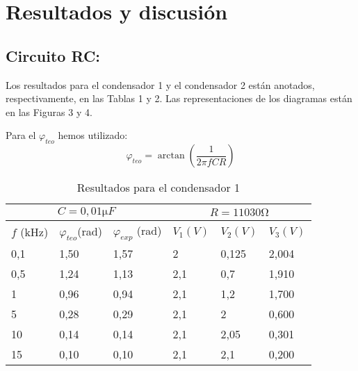 \documentclass[a4paper,12pt,spanish]{article}
\begin{document}
\section{Resultados y discusión}


\subsection*{Circuito RC:}

Los resultados para el condensador 1 y el condensador 2 están anotados, respectivamente, en las Tablas 1 y 2. Las representaciones de los diagramas están en las Figuras 3 y 4.

Para el $\varphi_{teo}$ hemos utilizado:
\[ \varphi_{teo} = \arctan\left(\frac{1}{2\pi f C R}\right) \]


\begin{table}[H]
	\centering
	\begin{tabular}{|lll|lll|}
		\hline
		\multicolumn{3}{|c|}{$C= 0,01 \si{\micro F}$}                                                                 & \multicolumn{3}{c|}{$R = 11030 \si{\ohm}$}                               \\ \hline
		\multicolumn{1}{|l|}{$f$ (kHz)} & \multicolumn{1}{l|}{$\varphi_{teo}$(rad)} & $\varphi_{exp}$ (rad) & \multicolumn{1}{l|}{$V_1 (\si{V})$}  & \multicolumn{1}{l|}{$V_2 (\si{V})$}    & $V_3 (\si{V})$ \\ \hline
		\multicolumn{1}{|l|}{0,1}     & \multicolumn{1}{l|}{1,50}                 & 1,57                     & \multicolumn{1}{l|}{2}   & \multicolumn{1}{l|}{0,125} & 2,004
	     \\ \hline
		\multicolumn{1}{|l|}{0,5}     & \multicolumn{1}{l|}{1,24}                 & 1,13                     & \multicolumn{1}{l|}{2,1} & \multicolumn{1}{l|}{0,7}   & 1,910       \\ \hline
		\multicolumn{1}{|l|}{1}       & \multicolumn{1}{l|}{0,96}                 & 0,94                     & \multicolumn{1}{l|}{2,1} & \multicolumn{1}{l|}{1,2}   & 1,700       \\ \hline
		\multicolumn{1}{|l|}{5}       & \multicolumn{1}{l|}{0,28}                 & 0,29                     & \multicolumn{1}{l|}{2,1} & \multicolumn{1}{l|}{2}     & 0,600       \\ \hline
		\multicolumn{1}{|l|}{10}      & \multicolumn{1}{l|}{0,14}                 & 0,14                     & \multicolumn{1}{l|}{2,1} & \multicolumn{1}{l|}{2,05}  & 0,301      \\ \hline
		\multicolumn{1}{|l|}{15}      & \multicolumn{1}{l|}{0,10}                 & 0,10                     & \multicolumn{1}{l|}{2,1} & \multicolumn{1}{l|}{2,1}   & 0,200         \\ \hline
	\end{tabular}
	\caption{Resultados para el condensador 1}
	\label{tab:my-table}
\end{table}
\end{document}
